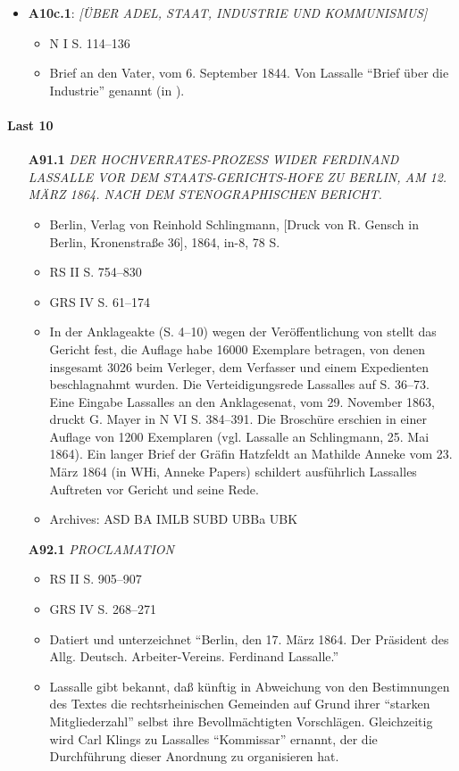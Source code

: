 \begin{itemize}
    \item \textbf{A10c.1}: \textit{[ÜBER ADEL, STAAT, INDUSTRIE UND KOMMUNISMUS]}
    \begin{itemize}
        \item N I S. 114--136
        \item Brief an den Vater, vom 6. September 1844. Von Lassalle ``Brief über die Industrie'' genannt (in ).
    \end{itemize}
\end{itemize}

\paragraph{Last 10}

\begin{itemize}
    \item[\textbf{A91.1}] \textit{DER HOCHVERRATES-PROZESS WIDER FERDINAND LASSALLE VOR DEM STAATS-GERICHTS-HOFE ZU BERLIN, AM 12. MÄRZ 1864. NACH DEM STENOGRAPHISCHEN BERICHT.}
    \begin{itemize}
        \item Berlin, Verlag von Reinhold Schlingmann, [Druck von R. Gensch in Berlin, Kronenstraße 36], 1864, in-8, 78 S.
        \item RS II S. 754--830
        \item GRS IV S. 61--174
        \item In der Anklageakte (S. 4--10) wegen der Veröffentlichung von  stellt das Gericht fest, die Auflage habe 16000 Exemplare betragen, von denen insgesamt 3026 beim Verleger, dem Verfasser und einem Expedienten beschlagnahmt wurden. Die Verteidigungsrede Lassalles auf S. 36--73. Eine Eingabe Lassalles an den Anklagesenat, vom 29. November 1863, druckt G. Mayer in N VI S. 384--391. Die Broschüre erschien in einer Auflage von 1200 Exemplaren (vgl. Lassalle an Schlingmann, 25. Mai 1864). Ein langer Brief der Gräfin Hatzfeldt an Mathilde Anneke vom 23. März 1864 (in WHi, Anneke Papers) schildert ausführlich Lassalles Auftreten vor Gericht und seine Rede.
        \item Archives: ASD BA IMLB SUBD UBBa UBK
    \end{itemize}
    
    \item[\textbf{A92.1}] \textit{PROCLAMATION}
    \begin{itemize}
        \item RS II S. 905--907
        \item GRS IV S. 268--271 		
        \item Datiert und unterzeichnet ``Berlin, den 17. März 1864. Der Präsident des Allg. Deutsch. Arbeiter-Vereins. Ferdinand Lassalle.''
        \item Lassalle gibt bekannt, daß künftig in Abweichung von den Bestimnungen des Textes  die rechtsrheinischen Gemeinden auf Grund ihrer ``starken Mitgliederzahl'' selbst ihre Bevollmächtigten Vorschlägen. Gleichzeitig wird Carl Klings zu Lassalles ``Kommissar'' ernannt, der die Durchführung dieser Anordnung zu organisieren hat.
    \end{itemize}
    

\end{itemize}
